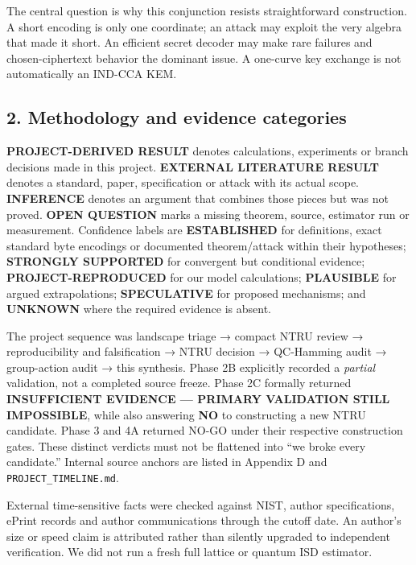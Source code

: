 \documentclass[
  10pt,
  a4paper,
]{article}
\begin{document}
The central question is why this conjunction resists straightforward
construction. A short encoding is only one coordinate; an attack may
exploit the very algebra that made it short. An efficient secret decoder
may make rare failures and chosen-ciphertext behavior the dominant
issue. A one-curve key exchange is not automatically an IND-CCA KEM.

\hypertarget{methodology-and-evidence-categories}{%
\subsection{2. Methodology and evidence
categories}\label{methodology-and-evidence-categories}}

\textbf{PROJECT-DERIVED RESULT} denotes calculations, experiments or
branch decisions made in this project. \textbf{EXTERNAL LITERATURE
RESULT} denotes a standard, paper, specification or attack with its
actual scope. \textbf{INFERENCE} denotes an argument that combines those
pieces but was not proved. \textbf{OPEN QUESTION} marks a missing
theorem, source, estimator run or measurement. Confidence labels are
\textbf{ESTABLISHED} for definitions, exact standard byte encodings or
documented theorem/attack within their hypotheses; \textbf{STRONGLY
SUPPORTED} for convergent but conditional evidence;
\textbf{PROJECT-REPRODUCED} for our model calculations;
\textbf{PLAUSIBLE} for argued extrapolations; \textbf{SPECULATIVE} for
proposed mechanisms; and \textbf{UNKNOWN} where the required evidence is
absent.

The project sequence was landscape triage → compact NTRU review →
reproducibility and falsification → NTRU decision → QC-Hamming audit →
group-action audit → this synthesis. Phase 2B explicitly recorded a
\emph{partial} validation, not a completed source freeze. Phase 2C
formally returned \textbf{INSUFFICIENT EVIDENCE --- PRIMARY VALIDATION
STILL IMPOSSIBLE}, while also answering \textbf{NO} to constructing a
new NTRU candidate. Phase 3 and 4A returned NO-GO under their respective
construction gates. These distinct verdicts must not be flattened into
``we broke every candidate.'' Internal source anchors are listed in
Appendix D and \texttt{PROJECT\_TIMELINE.md}.

External time-sensitive facts were checked against NIST, author
specifications, ePrint records and author communications through the
cutoff date. An author's size or speed claim is attributed rather than
silently upgraded to independent verification. We did not run a fresh
full lattice or quantum ISD estimator.
\end{document}

